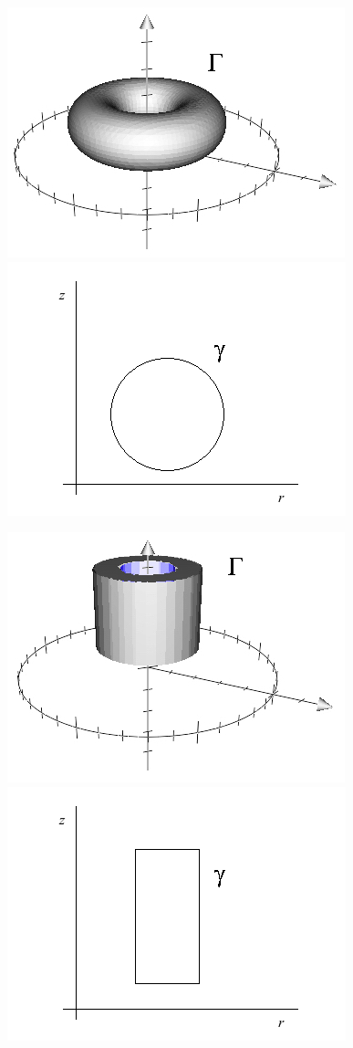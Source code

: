 \documentclass[11pt, oneside]{article}   	%
\begin{document}
\begin{center}
\includegraphics[scale=0.5]{torus}
\includegraphics[scale=0.5]{circle}
\end{center}
\begin{center}
\includegraphics[scale=0.5]{pipe2}
\includegraphics[scale=0.5]{rect}
\end{center}
\end{document}
